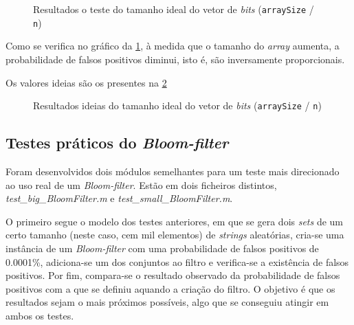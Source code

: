 \documentclass[a4paper,11pt,openright,oneside]{report}
\begin{document}
\begin{figure}[ht]	
\center
{}
\caption{Resultados o teste do tamanho ideal do vetor de \textit{bits} (\texttt{arraySize} / \texttt{n})}
\label{fig:optimalnimg}
\end{figure}

Como se verifica no gráfico da \ref{fig:optimalnimg}, à medida que o tamanho do \textit{array} aumenta, a probabilidade de falsos positivos diminui, isto é, são inversamente proporcionais.

Os valores ideias são os presentes na \ref{fig:optimalntext}

\begin{figure}[ht]	
\center
{}
\caption{Resultados ideias do tamanho ideal do vetor de \textit{bits} (\texttt{arraySize} / \texttt{n})}
\label{fig:optimalntext}
\end{figure}

\subsection{Testes práticos do \textit{Bloom-filter}}
\label{subsec.testebloom}

Foram desenvolvidos dois módulos semelhantes para um teste mais direcionado ao uso real de um \textit{Bloom-filter}. Estão em dois ficheiros distintos, \textit{test_big_BloomFilter.m} e \textit{test_small_BloomFilter.m}.

O primeiro segue o modelo dos testes anteriores, em que se gera dois \textit{sets} de um certo tamanho (neste caso, cem mil elementos) de \textit{strings} aleatórias, cria-se uma instância de um \textit{Bloom-filter} com uma probabilidade de falsos positivos de 0.0001\%, adiciona-se um dos conjuntos ao filtro e verifica-se a existência de falsos positivos. Por fim, compara-se o resultado observado da probabilidade de falsos positivos com a que se definiu aquando a criação do filtro. O objetivo é que os resultados sejam o mais próximos possíveis, algo que se conseguiu atingir em ambos os testes.
\end{document}
